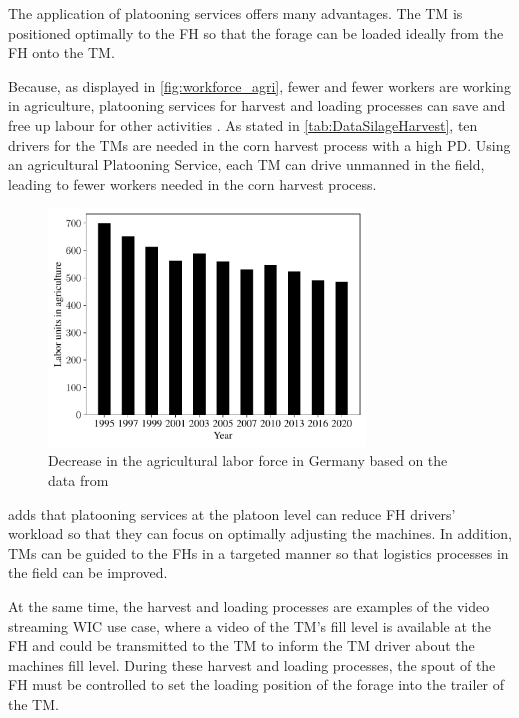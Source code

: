 The application of platooning services offers many advantages.
The \ac{TM} is positioned optimally to the \ac{FH} so that the forage can be loaded ideally from the \ac{FH} onto the \ac{TM}.

Because, as displayed in \autoref{fig:workforce_agri}, fewer and fewer workers are working in agriculture, platooning services for harvest and loading processes can save and free up labour for other activities \cite{liu_automation_2022}. As stated in \autoref{tab:DataSilageHarvest}, ten drivers for the \ac{TM}s are needed in the corn harvest process with a high \ac{PD}. Using an agricultural Platooning Service, each \ac{TM} can drive unmanned in the field, leading to fewer workers needed in the corn harvest process.

\begin{figure}[H]
   \centering
   \includegraphics[width=0.75\textwidth]{figures/WorkForceAgriculture.pdf}
   \caption{Decrease in the agricultural labor force in Germany based on the data from \cite{bmel2020}}%
   \label{fig:workforce_agri}%
\end{figure}

\textcite{smolnik_5g_2020} adds that platooning services at the platoon level can reduce \ac{FH} drivers' workload so that they can focus on optimally adjusting the machines.
In addition, \ac{TM}s can be guided to the \ac{FH}s in a targeted manner so that logistics processes in the field can be improved.

At the same time, the harvest and loading processes are examples of the video streaming \ac{WIC} use case, where a video of the \ac{TM}'s fill level is available at the \ac{FH} and could be transmitted to the \ac{TM} to inform the \ac{TM} driver about the machines fill level. During these harvest and loading processes, the spout of the \ac{FH} must be controlled to set the loading position of the forage into the trailer of the \ac{TM}.

